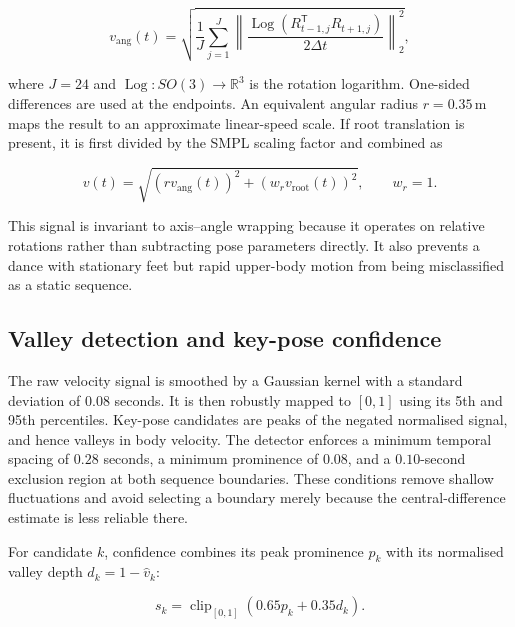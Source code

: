 \begin{equation}
    v_{\mathrm{ang}}(t)=
    \sqrt{\frac{1}{J}\sum_{j=1}^{J}
    \left\|
        \frac{\operatorname{Log}\!\left(
            R_{t-1,j}^{\mathsf{T}}R_{t+1,j}
        \right)}{2\Delta t}
    \right\|_2^2},
    \label{eq:angular_velocity_signal}
\end{equation}

where $J=24$ and $\operatorname{Log}:SO(3)\rightarrow\mathbb{R}^{3}$ is the
rotation logarithm. One-sided differences are used at the endpoints. An
equivalent angular radius $r=0.35\,\mathrm{m}$ maps the result to an approximate
linear-speed scale. If root translation is present, it is first divided by the
SMPL scaling factor and combined as

\begin{equation}
    v(t)=\sqrt{\left(r v_{\mathrm{ang}}(t)\right)^2
                   +\left(w_r v_{\mathrm{root}}(t)\right)^2},
    \qquad w_r=1.
    \label{eq:combined_motion_velocity}
\end{equation}

This signal is invariant to axis--angle wrapping because it operates on
relative rotations rather than subtracting pose parameters directly. It also
prevents a dance with stationary feet but rapid upper-body motion from being
misclassified as a static sequence.

\subsection{Valley detection and key-pose confidence}
\label{subsec:keypose_detection}

The raw velocity signal is smoothed by a Gaussian kernel with a standard
deviation of $0.08$ seconds. It is then robustly mapped to $[0,1]$ using its
5th and 95th percentiles. Key-pose candidates are peaks of the negated
normalised signal, and hence valleys in body velocity. The detector enforces a
minimum temporal spacing of $0.28$ seconds, a minimum prominence of $0.08$,
and a $0.10$-second exclusion region at both sequence boundaries. These
conditions remove shallow fluctuations and avoid selecting a boundary merely
because the central-difference estimate is less reliable there.

For candidate $k$, confidence combines its peak prominence $p_k$ with its
normalised valley depth $d_k=1-\widehat{v}_k$:

\begin{equation}
    s_k=\operatorname{clip}_{[0,1]}
        \left(0.65p_k+0.35d_k\right).
    \label{eq:keypose_score}
\end{equation}


